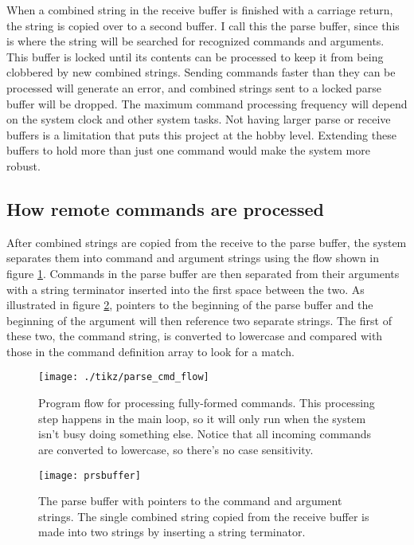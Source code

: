 When a combined string in the receive buffer is finished with a
carriage return, the string is copied over to a second buffer.  I call
this the parse buffer, since this is where the string will be searched
for recognized commands and arguments.  This buffer is locked until
its contents can be processed to keep it from being clobbered by new
combined strings.  Sending commands faster than they can be processed
will generate an error, and combined strings sent to a locked parse
buffer will be dropped.  The maximum command processing frequency will
depend on the system clock and other system tasks.  Not having larger
parse or receive buffers is a limitation that puts this project at the
hobby level.  Extending these buffers to hold more than just one
command would make the system more robust.

\clearpage{}
\subsection{How remote commands are processed}

After combined strings are copied from the receive to the parse
buffer, the system separates them into command and argument strings
using the flow shown in figure \ref{fig:cmdflow}.  Commands in the
parse buffer are then separated from their arguments with a string
terminator inserted into the first space between the two.  As
illustrated in figure \ref{fig:prsbuffer}, pointers to the beginning
of the parse buffer and the beginning of the argument will then
reference two separate strings.  The first of these two, the command
string, is converted to lowercase and compared with those in the
command definition array to look for a match.

\begin{figure}[ht]
  \begin{center}
    \texttt{[image: ./tikz/parse\_cmd\_flow]}
    \caption{Program flow for processing fully-formed commands.  This
      processing step happens in the main loop, so it will only run
      when the system isn't busy doing something else.  Notice that
      all incoming commands are converted to lowercase, so there's no
      case sensitivity.\label{fig:cmdflow}}
  \end{center}
\end{figure}


\begin{figure}[ht]
  \begin{center}
    \texttt{[image: prsbuffer]}
    \caption{The parse buffer with pointers to the command and
      argument strings.  The single combined string copied from the
      receive buffer is made into two strings by inserting a string
      terminator.\label{fig:prsbuffer}}
  \end{center}
\end{figure}






